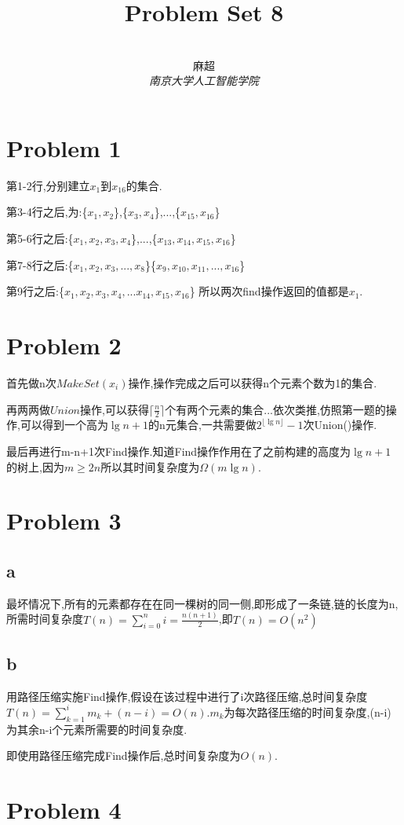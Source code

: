 \documentclass[12pt,a4paper,fontset=none]{ctexart}
\title{\textbf{Problem Set 8}}
\author{
\\
\Large{麻超 \quad 201300066}
\\[6pt]
{ \large \textit{南京大学人工智能学院}}\\[2pt]
}
\date{}
\begin{document}
\maketitle
\setcounter{page}{1}
\tableofcontents
\newpage
\section{Problem 1}
第1-2行,分别建立$x_1$到$x_16$的集合.

第3-4行之后,为:\{$x_1,x_2$\},\{$x_3,x_4$\},...,\{$x_{15},x_{16}$\}

第5-6行之后:\{$x_1,x_2,x_3,x_4$\},...,\{$x_{13},x_{14},x_{15},x_{16}$\}

第7-8行之后:\{$x_1,x_2,x_3,...,x_8$\}\{$x_9,x_{10},x_{11},...,x_{16}$\}

第9行之后:\{$x_1,x_2,x_3,x_4,...x_{14},x_{15},x_{16}$\}
所以两次find操作返回的值都是$x_1$.
\section{Problem 2}
首先做n次$MakeSet(x_i)$操作,操作完成之后可以获得n个元素个数为1的集合.

再两两做$Union$操作,可以获得$\lceil \frac{n}{2} \rceil$个有两个元素的集合...依次类推,仿照第一题的操作,可以得到一个高为$\lg n+1$的n元集合,一共需要做$2^{\lfloor \lg n\rfloor }-1$次Union()操作.

最后再进行m-n+1次Find操作.知道Find操作作用在了之前构建的高度为$\lg n+1$的树上,因为$m\geq 2n$所以其时间复杂度为$\Omega(m\lg n)$.
\section{Problem 3}
\subsection{a}
最坏情况下,所有的元素都存在在同一棵树的同一侧,即形成了一条链,链的长度为n,所需时间复杂度$T(n)=\sum_{i=0}^n i=\frac{n(n+1)}{2} $,即$T(n)=O(n^2)$
\subsection{b}
用路径压缩实施Find操作,假设在该过程中进行了i次路径压缩,总时间复杂度$T(n)=\sum_{k=1}^{i}m_k +(n-i)=O(n)$.$m_k$为每次路径压缩的时间复杂度,(n-i)为其余n-i个元素所需要的时间复杂度.

即使用路径压缩完成Find操作后,总时间复杂度为$O(n)$.
\section{Problem 4}
\end{document}
